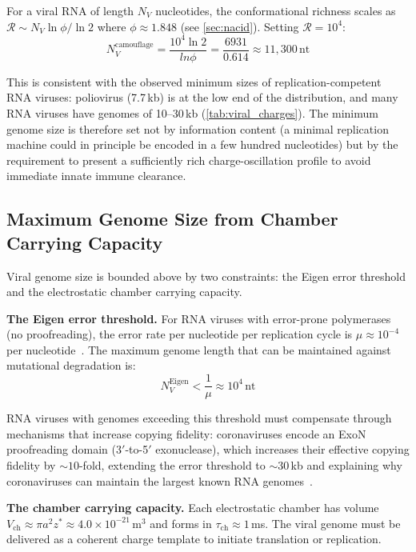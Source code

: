 \documentclass[11pt,twocolumn,a4paper]{article}
\theoremstyle{definition}
\theoremstyle{remark}
\newcommand{\Rcat}{\mathcal{R}}
\newcommand{\taucham}{\tau_{\mathrm{ch}}}
\newcommand{\zstar}{z^{*}}
\begin{document}
For a viral RNA of length $N_V$ nucleotides, the conformational richness scales as $\Rcat \sim N_V \ln\phi / \ln 2$ where $\phi \approx 1.848$ (see \cref{sec:nacid}). Setting $\Rcat = 10^4$:
\begin{equation}
  N_V^{\mathrm{camouflage}} = \frac{10^4 \ln 2}{ln\phi} = \frac{6931}{0.614} \approx 11,300\,\mathrm{nt}
  \label{eq:Ncamouflage}
\end{equation}

This is consistent with the observed minimum sizes of replication-competent RNA viruses: poliovirus (7.7\,kb) is at the low end of the distribution, and many RNA viruses have genomes of 10--30\,kb (\cref{tab:viral_charges}). The minimum genome size is therefore set not by information content (a minimal replication machine could in principle be encoded in a few hundred nucleotides) but by the requirement to present a sufficiently rich charge-oscillation profile to avoid immediate innate immune clearance.

\subsection{Maximum Genome Size from Chamber Carrying Capacity}

Viral genome size is bounded above by two constraints: the Eigen error threshold and the electrostatic chamber carrying capacity.

\textbf{The Eigen error threshold.}
For RNA viruses with error-prone polymerases (no proofreading), the error rate per nucleotide per replication cycle is $\mu \approx 10^{-4}$ per nucleotide~\cite{Drake1998,Eigen1971}. The maximum genome length that can be maintained against mutational degradation is:
\begin{equation}
  N_V^{\mathrm{Eigen}} < \frac{1}{\mu} \approx 10^4\,\mathrm{nt}
  \label{eq:eigen_threshold}
\end{equation}

RNA viruses with genomes exceeding this threshold must compensate through mechanisms that increase copying fidelity: coronaviruses encode an ExoN proofreading domain (3$'$-to-5$'$ exonuclease), which increases their effective copying fidelity by $\sim\!10$-fold, extending the error threshold to $\sim\!30$\,kb and explaining why coronaviruses can maintain the largest known RNA genomes~\cite{Denison2011,Eckerle2010}.

\textbf{The chamber carrying capacity.}
Each electrostatic chamber has volume $V_{\mathrm{ch}} \approx \pi a^2 \zstar \approx 4.0 \times 10^{-21}$\,m$^3$ and forms in $\taucham \approx 1$\,ms. The viral genome must be delivered as a coherent charge template to initiate translation or replication.
\end{document}
